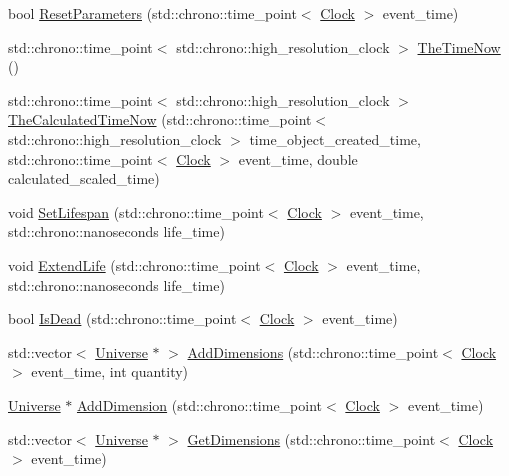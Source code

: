 \begin{DoxyCompactItemize}
\item 
bool \hyperlink{class_universe_a1d92b2277564577571c802f6e0c206dd}{Reset\+Parameters} (std\+::chrono\+::time\+\_\+point$<$ \hyperlink{universe_8h_a0ef8d951d1ca5ab3cfaf7ab4c7a6fd80}{Clock} $>$ event\+\_\+time)
\item 
std\+::chrono\+::time\+\_\+point$<$ std\+::chrono\+::high\+\_\+resolution\+\_\+clock $>$ \hyperlink{class_universe_ae54d34c5d695917e074b8e07e8820bdb}{The\+Time\+Now} ()
\item 
std\+::chrono\+::time\+\_\+point$<$ std\+::chrono\+::high\+\_\+resolution\+\_\+clock $>$ \hyperlink{class_universe_aa220508c4cc12b02c6fe494622ebb58d}{The\+Calculated\+Time\+Now} (std\+::chrono\+::time\+\_\+point$<$ std\+::chrono\+::high\+\_\+resolution\+\_\+clock $>$ time\+\_\+object\+\_\+created\+\_\+time, std\+::chrono\+::time\+\_\+point$<$ \hyperlink{universe_8h_a0ef8d951d1ca5ab3cfaf7ab4c7a6fd80}{Clock} $>$ event\+\_\+time, double calculated\+\_\+scaled\+\_\+time)
\item 
void \hyperlink{class_universe_ac3443dd59b61ae3110f07f681f63ed0a}{Set\+Lifespan} (std\+::chrono\+::time\+\_\+point$<$ \hyperlink{universe_8h_a0ef8d951d1ca5ab3cfaf7ab4c7a6fd80}{Clock} $>$ event\+\_\+time, std\+::chrono\+::nanoseconds life\+\_\+time)
\item 
void \hyperlink{class_universe_a982502e46868a00a9111738ccc9355c2}{Extend\+Life} (std\+::chrono\+::time\+\_\+point$<$ \hyperlink{universe_8h_a0ef8d951d1ca5ab3cfaf7ab4c7a6fd80}{Clock} $>$ event\+\_\+time, std\+::chrono\+::nanoseconds life\+\_\+time)
\item 
bool \hyperlink{class_universe_a8fdaa6d06584e1ef50c4c613b22b786e}{Is\+Dead} (std\+::chrono\+::time\+\_\+point$<$ \hyperlink{universe_8h_a0ef8d951d1ca5ab3cfaf7ab4c7a6fd80}{Clock} $>$ event\+\_\+time)
\item 
std\+::vector$<$ \hyperlink{class_universe}{Universe} $\ast$ $>$ \hyperlink{class_universe_a03bdf5f7fea4209241e9bf5316d45517}{Add\+Dimensions} (std\+::chrono\+::time\+\_\+point$<$ \hyperlink{universe_8h_a0ef8d951d1ca5ab3cfaf7ab4c7a6fd80}{Clock} $>$ event\+\_\+time, int quantity)
\item 
\hyperlink{class_universe}{Universe} $\ast$ \hyperlink{class_universe_a6326158c47bf3f7fe9297299a9b5b7b7}{Add\+Dimension} (std\+::chrono\+::time\+\_\+point$<$ \hyperlink{universe_8h_a0ef8d951d1ca5ab3cfaf7ab4c7a6fd80}{Clock} $>$ event\+\_\+time)
\item 
std\+::vector$<$ \hyperlink{class_universe}{Universe} $\ast$ $>$ \hyperlink{class_universe_a1869fc7bf43827378bab5a701f7f917a}{Get\+Dimensions} (std\+::chrono\+::time\+\_\+point$<$ \hyperlink{universe_8h_a0ef8d951d1ca5ab3cfaf7ab4c7a6fd80}{Clock} $>$ event\+\_\+time)

\end{DoxyCompactItemize}
